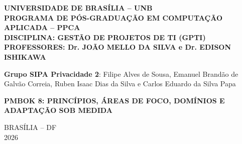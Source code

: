\documentclass[12pt,a4paper,article,oneside,english,brazil]{abntex2}
\newcommand{\integrantes}{Filipe Alves de Sousa, Emanuel Brandão de Galvão Correia, Ruben Isaac Dias da Silva e Carlos Eduardo da Silva Papa}
\newif\ifavisocapa   \avisocapafalse    %
\begin{document}
\thispagestyle{empty}
\noindent\begin{minipage}[t][0.92\textheight]{\textwidth}
\centering
\SingleSpacing
\textbf{UNIVERSIDADE DE BRASÍLIA -- UNB\\PROGRAMA DE PÓS-GRADUAÇÃO EM COMPUTAÇÃO APLICADA -- PPCA\\DISCIPLINA: GESTÃO DE PROJETOS DE TI (GPTI)\\PROFESSORES: Dr. JOÃO MELLO DA SILVA e Dr. EDISON ISHIKAWA}

\vspace{1cm}

\textbf{Grupo SIPA Privacidade 2}: \integrantes

\vspace{3cm}

\textbf{PMBOK 8: PRINCÍPIOS, ÁREAS DE FOCO, DOMÍNIOS E ADAPTAÇÃO SOB MEDIDA}

\vspace{1.2cm}
\ifavisocapa
\begin{center}\fbox{\parbox{\dimexpr\linewidth-2\fboxsep-2\fboxrule\relax}{\SingleSpacing\small\noindent\textbf{Declaração de uso de inteligência artificial.} Foi utilizada IA generativa (ChatGPT Astral 6 Sol e Sonnet 5.5, ambos no modo alto) como apoio à revisão de texto, à formatação, à criação de figuras e à formulação de tabelas. A IA não é autora: o grupo é responsável pelo conteúdo, conforme a posição do COPE sobre autoria e ferramentas de IA (COPE, 2023).\par\smallskip\noindent COMMITTEE ON PUBLICATION ETHICS (COPE). \textit{Authorship and AI tools: COPE position statement}. 13 fev. 2023. Disponível em: \url{https://publicationethics.org/guidance/cope-position/authorship-and-ai-tools}.}}\end{center}
\fi
\vfill

BRASÍLIA -- DF\\2026
\end{minipage}
\clearpage
\end{document}
